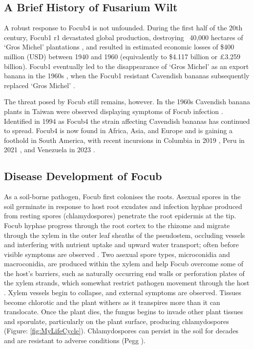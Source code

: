 \subsection{A Brief History of Fusarium Wilt}
\label{chap1:focHistory}
A robust response to \ac{Focub4} is not unfounded. During the first half of the 20th century, \ac{Focub1} \ac{r1} devastated global production, destroying  ~40,000 hectares of ‘Gros Michel’ plantations \parencite{Agrios2005, Kema2021}, and resulted in estimated economic losses of \$400 million (USD) between 1940 and 1960 (equivalently to \$4.117 billion or £3.259 billion)\parencite{Ploetz2005}. \ac{Focub1} eventually led to the disappearance of ‘Gros Michel’ as an export banana in the 1960s \parencite{Molina2007}, when the \ac{Focub1} resistant Cavendish bananas subsequently replaced ‘Gros Michel’ \parencite{Ordonez2015}. 

The threat posed by \ac{Focub} still remains, however. In the 1960s Cavendish banana plants in Taiwan were observed displaying symptoms of \ac{Focub} infection \parencite{Agrios2005}. Identified in 1994 as \acl{Focub4} \parencite{Ploetz1994} the strain affecting Cavendish bananas has continued to spread. \Ac{Focub4} is now found in Africa, Asia, and Europe \parencite{Ploetz2015a, Thangavelu2019} and is gaining a foothold in South America, with recent incursions in Columbia in 2019 \parencite{Garcia-Bastidas2019}, Peru in 2021 \parencite{Acuna2022}, and Venezuela in 2023 \parencite{Herrera2023}.

\subsection{Disease Development of \acl{Focub}}

As a soil-borne pathogen, \ac{Focub} first colonises the roots. Asexual spores in the soil germinate in response to host root exudates and infection hyphae produced from resting spores (chlamydospores) penetrate the root epidermis at the tip. \ac{Focub} hyphae progress through the root cortex to the rhizome and migrate through the xylem in the outer leaf sheaths of the pseudostem, occluding vessels and interfering with nutrient uptake and upward water transport; often before visible symptoms are observed \parencite{Li2017, Warman2018}. Two asexual spore types, microconidia and macroconidia, are produced within the xylem and help \ac{Focub} overcome some of the host’s barriers, such as naturally occurring end walls or perforation plates of the xylem strands, which somewhat restrict pathogen movement through the host \parencite{Dita2018}. Xylem vessels begin to collapse, and external symptoms are observed. Tissues become chlorotic and the plant withers as it transpires more than it can translocate. Once the plant dies, the fungus begins to invade other plant tissues and sporulate, particularly on the plant surface, producing chlamydospores (Figure: \ref{fig:MyLifeCycle}). Chlamydospores can persist in the soil for decades and are resistant to adverse conditions (Pegg ).  

